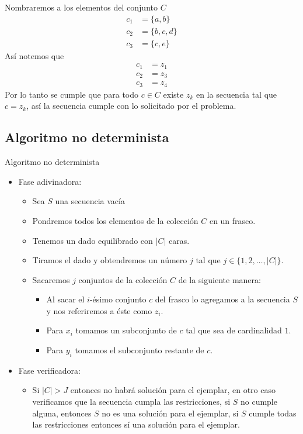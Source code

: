 \documentclass[spanish, xcolor=dvipsnames, aspectratio=169]{beamer}
\newcommand{\subsectiontitle}{}
\begin{document}
\begin{frame}{\subsectiontitle}
    Nombraremos a los elementos del conjunto \(C\)
    \begin{align*}
        c_{1} &= \{a, b\} \\
        c_{2} &= \{b, c, d\} \\
        c_{3} &= \{c, e\}
    \end{align*}
    Así notemos que 
    \begin{align*}
        c_{1} &= z_{1} \\
        c_{2} &= z_{3} \\
        c_{3} &= z_{4}
    \end{align*}
    Por lo tanto se cumple que para todo \(c \in C\) existe \(z_{k}\) en la secuencia tal que \(c = z_{k}\), así la secuencia cumple con 
    lo solicitado por el problema.
\end{frame}
\renewcommand{\subsectiontitle}{Algoritmo no determinista}
\subsection{\subsectiontitle}
\begin{frame}{\subsectiontitle}
    \begin{itemize}
        \item Fase adivinadora:
        \begin{itemize}
            \item Sea $S$ una secuencia vacía
            \item Pondremos todos los elementos de la colección \( C \) en un frasco.
            \item Tenemos un dado equilibrado con $|C|$ caras.
            \item Tiramos el dado y obtendremos un número \( j \) tal que \( j \in \{1, 2, \dotsc, |C| \}\).
            \item Sacaremos $j$ conjuntos de la colección $C$ de la siguiente manera:
            \begin{itemize}
                \item Al sacar el \(i\)-ésimo conjunto $c$ del frasco lo agregamos a la secuencia $S$ y nos referiremos a éste como $z_{i}$.
                \item Para $x_{i}$ tomamos un subconjunto de $c$ tal que sea de cardinalidad $1$.
                \item Para $y_{i}$ tomamos el subconjunto restante de $c$.
            \end{itemize}
        \end{itemize} 
        \item Fase verificadora:
        \begin{itemize}
            \item Si $|C| > J$ entonces no habrá solución para el ejemplar, en otro caso verificamos que la secuencia cumpla las restricciones, si $S$ no cumple alguna, entonces $S$ no es una solución para el ejemplar, si $S$ cumple todas las restricciones entonces sí una solución para el ejemplar.
        \end{itemize}
    \end{itemize}
\end{frame}
\renewcommand{\subsectiontitle}{Complejidad del algoritmo no determinista}
\end{document}
